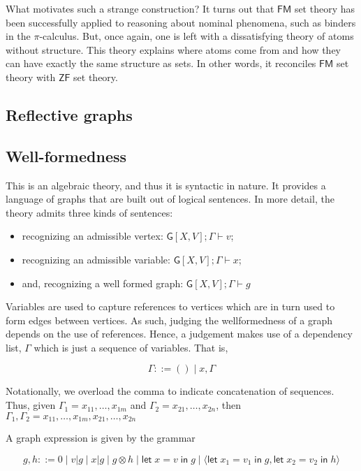 What motivates such a strange construction? It turns out that
$\mathsf{FM}$ set theory has been successfully applied to reasoning
about nominal phenomena, such as binders in the $\pi$-calculus. But,
once again, one is left with a dissatisfying theory of atoms without
structure. This theory explains where atoms come from and how they can
have exactly the same structure as sets. In other words, it reconciles
$\mathsf{FM}$ set theory with $\mathsf{ZF}$ set theory.

\subsection{Reflective graphs}

\subsection{Well-formedness}

This is an algebraic theory, and thus it is syntactic in nature. It
provides a language of graphs that are built out of logical sentences.
In more detail, the theory admits three kinds of sentences:

\begin{itemize}
\item
  recognizing an admissible vertex:
  \(\mathsf{G}[X,V]; \Gamma \vdash v\);
\item
  recognizing an admissible variable:
  \(\mathsf{G}[X,V]; \Gamma \vdash x\);
\item
  and, recognizing a well formed graph:
  \(\mathsf{G}[X,V]; \Gamma \vdash g\)
\end{itemize}

Variables are used to capture references to vertices which are in turn
used to form edges between vertices. As such, judging the wellformedness
of a graph depends on the use of references. Hence, a judgement makes
use of a dependency list, \(\Gamma\) which is just a sequence of
variables. That is,

\[\Gamma ::= () \;|\; x, \Gamma\]

Notationally, we overload the comma to indicate concatenation of
sequences. Thus, given \(\Gamma_1 = x_{11},\ldots,x_{1m}\) and
\(\Gamma_2 = x_{21},\ldots,x_{2n}\), then
\(\Gamma_1,\Gamma_2 = x_{11},\ldots,x_{1m},x_{21},\ldots,x_{2n}\)

A graph expression is given by the grammar

\[g,h ::= 0 \;|\; v|g \;|\; x|g \;|\; g \otimes h \; |\;\mathsf{let}\; x = v \; \mathsf{in}\; g \;|\; \langle \mathsf{let}\; x_1 = v_1 \; \mathsf{in}\; g, \mathsf{let}\; x_2 = v_2 \; \mathsf{in}\; h\rangle\]

